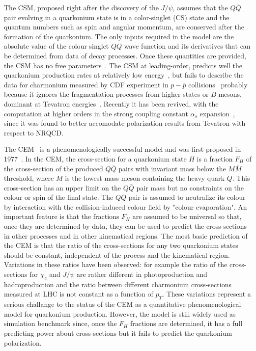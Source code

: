 \documentclass{iopart}
\begin{document}
The CSM, proposed right after the discovery of the $J/\psi$, assumes that the $Q \bar Q$ pair evolving in a quarkonium state is in a color-singlet (CS) state and the quantum numbers such as spin and angular momentum, are conserved after the formation of the quarkonium. The only inputs required in the model are the absolute value of the colour singlet $Q \bar Q$ wave function and its derivatives that can be determined from data of decay processes. Once these quantities are provided, the CSM has no free parameters~\cite{npb172}. The CSM at leading-order, predicts well the quarkonium production rates at relatively low energy~\cite{arx94}, but fails to describe the data for charmonium measured by CDF experiment in $p-\bar p$ collisions~\cite{prl69} probably because it ignores the 
fragmentation processes from higher states or $B$ mesons, dominant at Tevatron energies~\cite{prl71}. Recently it has been revived, with the computation at higher orders in the strong coupling constant $\alpha_{s}$ expansion~\cite{plb653,prl98,prl101}, since it was found to better accomodate polarization results from Tevatron with respect to NRQCD.

The CEM~\cite{arx041} is a phenomenologically successful model and was first proposed in 1977~\cite{plb67}. In the CEM, the cross-section for a quarkonium state $H$ is a fraction $F_{H}$ of the cross-section of the produced $Q \bar Q$ pairs with invariant mass below the $M \bar M$ threshold, where $M$ is the lowest mass meson containing the heavy quark $Q$. This cross-section has an upper limit on the $Q \bar Q$ pair mass but no constraints on the colour or spin of the final state. The $Q \bar Q$ pair is assumed to neutralize its colour by interaction with the collision-induced colour field by "colour evaporation". An important feature is that the fractions $F_{H}$ are assumed to be universal so that, once they are determined by data, they can be used to predict the cross-sections in other processes and in other kinematical regions. The most basic prediction of the CEM is that the ratio of the cross-sections for any two quarkonium states should be constant, independent of the process and the kinematical region. Variations in these ratios have been observed: for example the ratio of the cross-sections for $\chi_{c}$ and $J/\psi$ are rather different in photoproduction and hadroproduction and the ratio between different charmonium cross-sections measured at LHC is not constant as a function of $p_T$. These variations represent a serious challange to the status of the CEM as a quantitative phenomenological model for quarkonium production. However, the model is still widely used as simulation benchmark since, once the $F_{H}$ fractions are determined, it has a full predicting power about cross-sections but it fails to predict the quarkonium polarization. 
\end{document}
